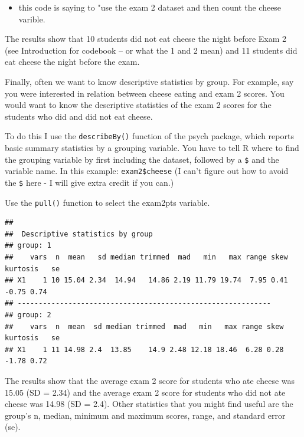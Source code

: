 \documentclass[
]{book}
\newenvironment{Shaded}{\begin{snugshade}}{\end{snugshade}}
\newcommand{\KeywordTok}[1]{\textcolor[rgb]{0.13,0.29,0.53}{\textbf{#1}}}
\newcommand{\NormalTok}[1]{#1}
\newcommand{\OperatorTok}[1]{\textcolor[rgb]{0.81,0.36,0.00}{\textbf{#1}}}
\newcommand{\StringTok}[1]{\textcolor[rgb]{0.31,0.60,0.02}{#1}}
\providecommand{\tightlist}{%
  \setlength{\itemsep}{0pt}\setlength{\parskip}{0pt}}
\begin{document}
\begin{itemize}
\tightlist
\item
  this code is saying to "use the exam 2 dataset and then count the cheese varible.
\end{itemize}

The results show that 10 students did not eat cheese the night before Exam 2 (see Introduction for codebook -- or what the 1 and 2 mean) and 11 students did eat cheese the night before the exam.

Finally, often we want to know descriptive statistics by group. For example, say you were interested in relation between cheese eating and exam 2 scores. You would want to know the descriptive statistics of the exam 2 scores for the students who did and did not eat cheese.

To do this I use the \texttt{describeBy()} function of the psych package, which reports basic summary statistics by a grouping variable. You have to tell R where to find the grouping variable by first including the dataset, followed by a \texttt{\$} and the variable name. In this example: \texttt{exam2\$cheese} (I can't figure out how to avoid the \texttt{\$} here - I will give extra credit if you can.)

Use the \texttt{pull()} function to select the exam2pts variable.

\begin{Shaded}
\end{Shaded}

\begin{verbatim}
## 
##  Descriptive statistics by group 
## group: 1
##    vars  n  mean   sd median trimmed  mad   min   max range skew kurtosis   se
## X1    1 10 15.04 2.34  14.94   14.86 2.19 11.79 19.74  7.95 0.41    -0.75 0.74
## ------------------------------------------------------------ 
## group: 2
##    vars  n  mean  sd median trimmed  mad   min   max range skew kurtosis   se
## X1    1 11 14.98 2.4  13.85    14.9 2.48 12.18 18.46  6.28 0.28    -1.78 0.72
\end{verbatim}

The results show that the average exam 2 score for students who ate cheese was 15.05 (SD = 2.34) and the average exam 2 score for students who did not ate cheese was 14.98 (SD = 2.4). Other statistics that you might find useful are the group's n, median, minimum and maximum scores, range, and standard error (se).
\end{document}
